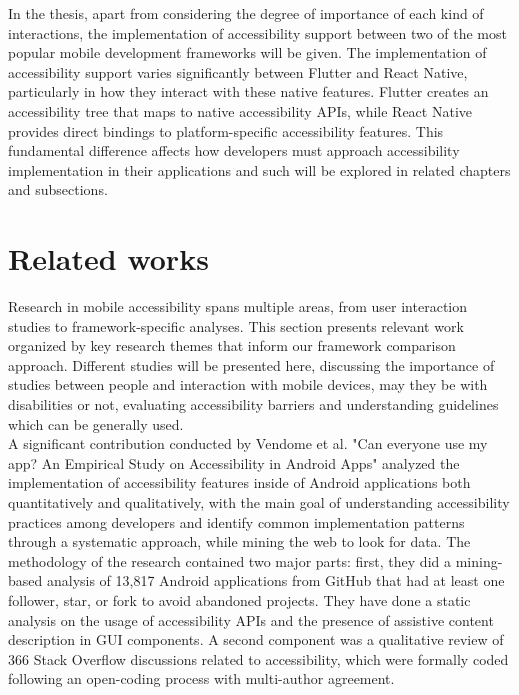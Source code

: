 In the thesis, apart from considering the degree of importance of each kind of interactions, the implementation of accessibility support between two of the most popular mobile development frameworks will be given. The implementation of accessibility support varies significantly between Flutter and React Native, particularly in how they interact with these native features. Flutter creates an accessibility tree that maps to native accessibility APIs, while React Native provides direct bindings to platform-specific accessibility features. This fundamental difference affects how developers must approach accessibility implementation in their applications and such will be explored in related chapters and subsections.

\section{Related works}
\label{chap:intro-related-works}

Research in mobile accessibility spans multiple areas, from user interaction studies to framework-specific analyses. This section presents relevant work organized by key research themes that inform our framework comparison approach. Different studies will be presented here, discussing the importance of studies between people and interaction with mobile devices, may they be with disabilities or not, evaluating accessibility barriers and understanding guidelines which can be generally used. \\

A significant contribution conducted by Vendome et al. "Can everyone use my app? An Empirical Study on Accessibility in Android Apps" \cite{vendome2019can} analyzed the implementation of accessibility features inside of Android applications both quantitatively and qualitatively, with the main goal of understanding accessibility practices among developers and identify common implementation patterns through a systematic approach, while mining the web to look for data. The methodology of the research contained two major parts: first, they did a mining-based analysis of 13,817 Android applications from GitHub that had at least one follower, star, or fork to avoid abandoned projects. They have done a static analysis on the usage of accessibility APIs and the presence of assistive content description in GUI components. A second component was a qualitative review of 366 Stack Overflow discussions related to accessibility, which were formally coded following an open-coding process with multi-author agreement. \\

